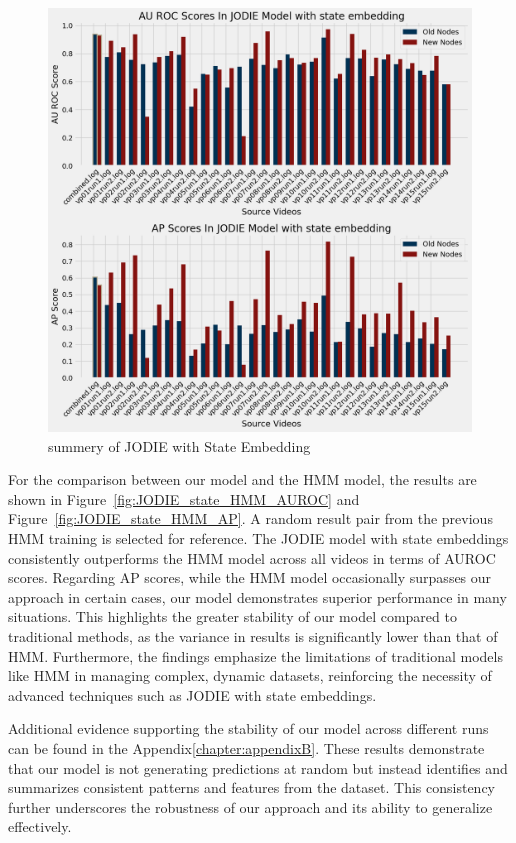 \begin{figure}[h]
    \centering
    \includegraphics[width=\textwidth]{figures/05_JODIE_with_state.png}
    \caption{summery of JODIE with State Embedding}
    \label{fig:JODIE_state_embedding_results}
\end{figure}

\clearpage


For the comparison between our model and the HMM model, the results are shown in Figure~\ref{fig:JODIE_state_HMM_AUROC} and Figure~\ref{fig:JODIE_state_HMM_AP}. A random result pair from the previous HMM training is selected for reference. The JODIE model with state embeddings consistently outperforms the HMM model across all videos in terms of AUROC scores. Regarding AP scores, while the HMM model occasionally surpasses our approach in certain cases, our model demonstrates superior performance in many situations. This highlights the greater stability of our model compared to traditional methods, as the variance in results is significantly lower than that of HMM. Furthermore, the findings emphasize the limitations of traditional models like HMM in managing complex, dynamic datasets, reinforcing the necessity of advanced techniques such as JODIE with state embeddings.

Additional evidence supporting the stability of our model across different runs can be found in the Appendix\ref{chapter:appendixB}. These results demonstrate that our model is not generating predictions at random but instead identifies and summarizes consistent patterns and features from the dataset. This consistency further underscores the robustness of our approach and its ability to generalize effectively.

